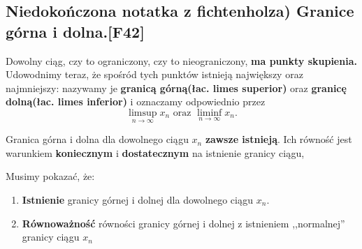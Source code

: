 \subsection{Niedokończona notatka z fichtenholza) Granice górna i dolna.[F42]}

Dowolny ciąg, czy to ograniczony, czy to nieograniczony, \textbf{ma punkty skupienia.} Udowodnimy teraz, że spośród tych punktów istnieją największy oraz najmniejszy: nazywamy je \textbf{granicą górną(łac. limes superior)} oraz \textbf{granicę dolną(łac. limes inferior)} i oznaczamy odpowiednio przez 
\[
	\limsup_{n \to \infty}  x_{n} \text{ oraz } \liminf_{n \to \infty}  x_{n}
.\] 
\begin{theorem}
	Granica górna i dolna dla dowolnego ciągu $x_{n} $ \textbf{zawsze istnieją}. Ich równość jest warunkiem \textbf{koniecznym} i \textbf{dostatecznym} na istnienie granicy ciągu,
\end{theorem} 
\begin{goall} Musimy pokazać, że:
	
	\begin{enumerate}[label=\Roman*.]
		\item \textbf{Istnienie} granicy górnej i dolnej dla dowolnego ciągu $x_{n}$.
		\item \textbf{Równoważność} równości granicy górnej i dolnej z istnieniem ,,normalnej'' granicy ciągu $x_{n}$ 
	\end{enumerate}
	\end{goall} 

